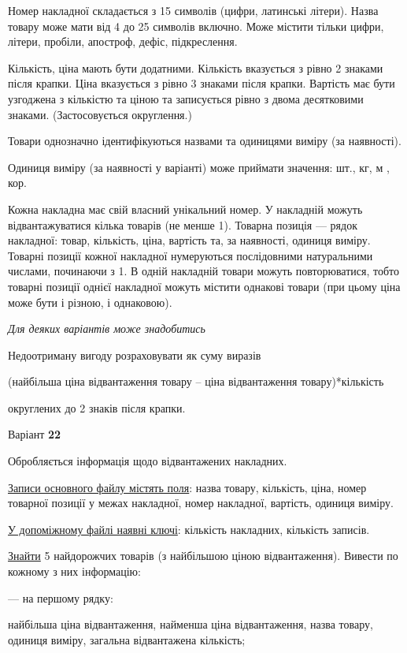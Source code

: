 \documentclass[11pt, ukrainian]{article}
\begin{document}
Номер накладної складається з 15 символів (цифри, латинські літери).
Назва товару може мати від 4 до 25 символів включно.
Може містити тільки цифри, літери, пробіли, апостроф, дефіс, підкреслення.

Кількість, ціна мають бути додатними.
Кількість вказується з рівно 2 знаками після крапки.
Ціна вказується з рівно 3 знаками після крапки.
Вартість має бути узгоджена з кількістю та ціною та записується рівно з двома десятковими знаками.
(Застосовується округлення.)

Товари однозначно ідентифікуються назвами та одиницями виміру (за наявності).

Одиниця виміру (за наявності у варіанті) може приймати значення: шт., кг, м , кор.

Кожна накладна має свій власний унікальний номер.
У накладній можуть відвантажуватися кілька товарів (не менше 1).
Товарна позиція --- рядок накладної: товар, кількість, ціна, вартість та, за наявності, одиниця виміру.
Товарні позиції кожної накладної нумеруються послідовними натуральними числами, починаючи з 1.
В одній накладній товари можуть повторюватися, 
тобто товарні позиції однієї накладної можуть містити однакові товари 
(при цьому ціна може бути і різною, і однаковою).

\bigskip\textit{Для деяких варіантів може знадобитись}

Недоотриману вигоду розраховувати як суму виразів
{\center (найбільша ціна відвантаження товару – ціна відвантаження товару)*кількість\par}

\bigskip
{\noindent} округлених до 2 знаків після крапки.


\par
\newpage
{\center Варіант  \No \textbf { 22 }\par}
\bigskip
Обробляється інформація щодо відвантажених накладних.

\underline{Записи основного файлу містять поля}: назва товару, кількість, ціна, номер товарної позиції у межах накладної, номер накладної, вартість, одиниця виміру.

\underline{У допоміжному файлі наявні ключі}: кількість накладних, кількість записів.

\underline{Знайти} 5 найдорожчих товарів (з найбільшою ціною відвантаження). Вивести по кожному з них інформацію:\par
{\noindent}--- на першому рядку:\par
найбільша ціна відвантаження, найменша ціна відвантаження, назва товару, одиниця виміру, загальна відвантажена кількість;
\end{document}
